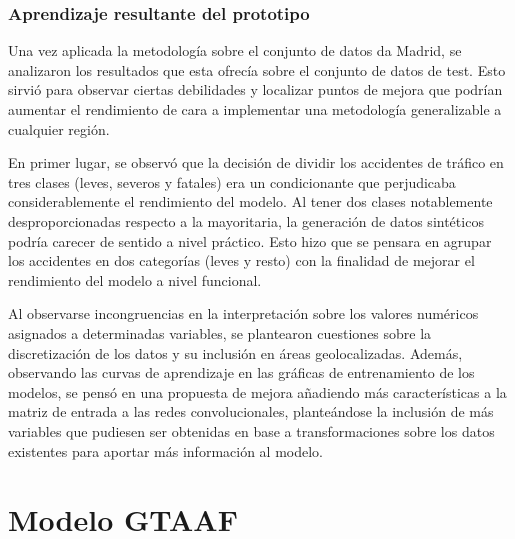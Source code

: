 \documentclass{uathesis-es}
\begin{document}
	
	\subsubsection*{Aprendizaje resultante del prototipo}
	
	
	Una vez aplicada la metodología sobre el conjunto de datos da Madrid, se analizaron los resultados que esta ofrecía sobre el conjunto de datos de test. Esto sirvió para observar ciertas debilidades y localizar puntos de mejora que podrían aumentar el rendimiento de cara a implementar una metodología generalizable a cualquier región.
	
	En primer lugar, se observó que la decisión de dividir los accidentes de tráfico en tres clases (leves, severos y fatales) era un condicionante que perjudicaba considerablemente el rendimiento del modelo. Al tener dos clases notablemente desproporcionadas respecto a la mayoritaria, la generación de datos sintéticos podría carecer de sentido a nivel práctico. Esto hizo que se pensara en agrupar los accidentes en dos categorías (leves y resto) con la finalidad de mejorar el rendimiento del modelo a nivel funcional.
	
	
	Al observarse incongruencias en la interpretación sobre los valores numéricos asignados a determinadas variables, se plantearon cuestiones sobre la discretización de los datos y su inclusión en áreas geolocalizadas. Además, observando las curvas de aprendizaje en las gráficas de entrenamiento de los modelos, se pensó en una propuesta de mejora añadiendo más características a la matriz de entrada a las redes convolucionales, planteándose la inclusión de más variables que pudiesen ser obtenidas en base a transformaciones sobre los datos existentes para aportar más información al modelo.
	
	\section{Modelo GTAAF}
	\label{METODOLOGIA_GTAAF}
	
	
\end{document}
